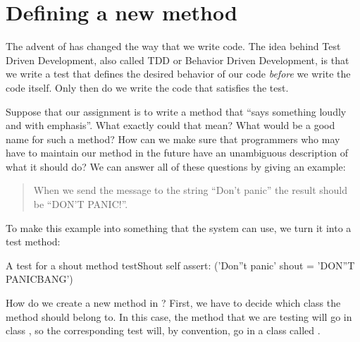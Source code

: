 \documentclass[a4paper,10pt,twoside]{book}
\begin{document}
\section{Defining a new method}

The advent of \cite{Beck03a} has changed the way that we write code.  
The idea behind Test Driven Development, also called TDD or Behavior Driven Development, is that we write a test that defines the desired behavior of our code \emph{before} we write the code itself.
Only then do we write the code that satisfies the test.

Suppose that our assignment is to write a method that ``says something loudly and with emphasis''.  What exactly could that mean?  What would be a good name for such a method?  How can we make sure  that programmers who may have to maintain our method in the future have an unambiguous description of what it should do?   We can answer all of these questions by giving an example:

\begin{quote}
When we send the message  to the string ``Don't panic'' the result should be ``DON'T PANIC!''.
\end{quote}

\noindent
To make this example into something that the system can use, we turn it into a test method:

\begin{method}[testShout]{A test for a shout method}
testShout
	self assert: ('Don''t panic' shout = 'DON''T PANICBANG')
\end{method} %

How do we create a new method in \sq?   First, we have to decide which class the method should belong to.
In this case, the  method that we are testing will go in class , so the corresponding test will, by convention, go in a class called .
\end{document}
